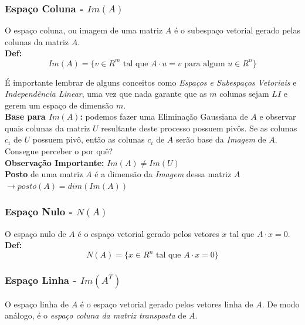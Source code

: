 \documentclass[12pt]{article}
\begin{document}
	\subsubsection{Espaço Coluna - $Im(A)$}
	O espaço coluna, ou imagem de uma matriz $A$ é o subespaço vetorial gerado pelas colunas da matriz $A$.\\
	
	\textbf{Def:}
	\begin{equation*}
		Im(A)=\{v \in R^m \mbox{ tal que } A\cdot u=v \mbox{ para algum }u\in R^n\}
	\end{equation*}
	
	É importante lembrar de alguns conceitos como \textit{Espaços e Subespaços Vetoriais} e \textit{Independência Linear}, uma vez que nada garante que as $m$ colunas sejam $LI$ e gerem um espaço de dimensão $m$.\\
	
	\textbf{Base para $Im(A)$:} podemos fazer uma Eliminação Gaussiana de $A$ e observar quais colunas da matriz $U$ resultante deste processo possuem pivôs. Se as colunas $c_i$ de $U$ possuem pivô, então as colunas $c_i$ de $A$ serão base da \textit{Imagem} de $A$. Consegue perceber o por quê?\\
	
	\textbf{Observação Importante:} $Im(A)\neq Im(U)$\\
	
	\textbf{Posto} de uma matriz $A$ é a dimensão da \textit{Imagem} dessa matriz $A$ $\rightarrow posto(A)=dim(Im(A))$
	
	\subsubsection{Espaço Nulo - $N(A)$}
	
	O espaço nulo de $A$ é o espaço vetorial gerado pelos vetores $x$ tal que $A\cdot x=0$.\\
	
	\textbf{Def:}
	\begin{equation*}
		N(A)=\{x \in R^n \mbox{ tal que }A\cdot x=0\}
	\end{equation*}
	
	\subsubsection{Espaço Linha - $Im(A^T)$}
	
	O espaço linha de $A$ é o espaço vetorial gerado pelos vetores linha de $A$. De modo análogo, é o\textit{ espaço coluna da matriz transposta} de $A$.\\
	
\end{document}
